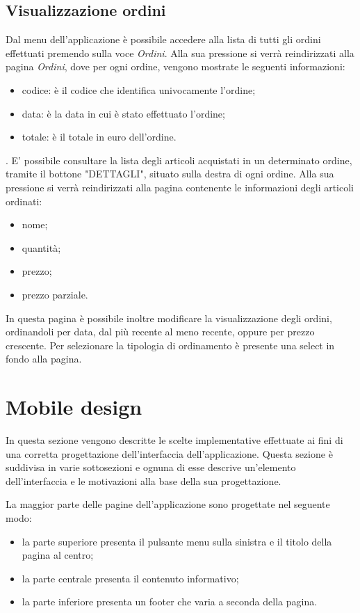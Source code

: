 \documentclass[12pt, a4paper, titlepage]{report}
\begin{document}
	\subsection{Visualizzazione ordini}
	Dal menu dell'applicazione è possibile accedere alla lista di tutti gli ordini effettuati premendo sulla voce \textit{Ordini}. Alla sua pressione si verrà reindirizzati alla pagina \textit{Ordini}, dove per ogni ordine, vengono mostrate le seguenti informazioni:
	\begin{itemize}
		\item codice: è il codice che identifica univocamente l'ordine;
		\item data: è la data in cui è stato effettuato l'ordine;
		\item totale: è il totale in euro dell'ordine.
	\end{itemize}. 
	E' possibile consultare la lista degli articoli acquistati in un determinato ordine, tramite il bottone "DETTAGLI", situato sulla destra di ogni ordine. Alla sua pressione si verrà reindirizzati alla pagina contenente le informazioni degli articoli ordinati:
	\begin{itemize}
		\item nome;
		\item quantità;
		\item prezzo;
		\item prezzo parziale.
	\end{itemize}
	\noindent In questa pagina è possibile inoltre modificare la visualizzazione degli ordini, ordinandoli per data, dal più recente al meno recente, oppure per prezzo crescente. Per selezionare la tipologia di ordinamento è presente una select in fondo alla pagina.
	
	\section{Mobile design}
	
	In questa sezione vengono descritte le scelte implementative effettuate ai fini di una corretta progettazione dell'interfaccia dell'applicazione. Questa sezione è suddivisa in varie sottosezioni e ognuna di esse descrive un'elemento dell'interfaccia e le motivazioni alla base della sua progettazione.
	
	La maggior parte delle pagine dell'applicazione sono progettate nel seguente modo:
	\begin{itemize}
		\item la parte superiore presenta il pulsante menu sulla sinistra e il titolo della pagina al centro;
		\item la parte centrale presenta il contenuto informativo;
		\item la parte inferiore presenta un footer che varia a seconda della pagina.
	\end{itemize}
	
\end{document}
